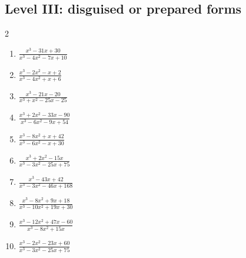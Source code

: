\documentclass[11pt,oneside]{book}
\begin{document}
\subsection*{Level III: disguised or prepared forms}
\begin{multicols}{2}
\begin{enumerate}[leftmargin=*,label=\textbf{\arabic*.},itemsep=0.65\baselineskip]
\item $\displaystyle \frac{x^{3} - 31 x + 30}{x^{3} - 4 x^{2} - 7 x + 10}$
\item $\displaystyle \frac{x^{3} - 2 x^{2} - x + 2}{x^{3} - 4 x^{2} + x + 6}$
\item $\displaystyle \frac{x^{3} - 21 x - 20}{x^{3} + x^{2} - 25 x - 25}$
\item $\displaystyle \frac{x^{3} + 2 x^{2} - 33 x - 90}{x^{3} - 6 x^{2} - 9 x + 54}$
\item $\displaystyle \frac{x^{3} - 8 x^{2} + x + 42}{x^{3} - 6 x^{2} - x + 30}$
\item $\displaystyle \frac{x^{3} + 2 x^{2} - 15 x}{x^{3} - 3 x^{2} - 25 x + 75}$
\item $\displaystyle \frac{x^{3} - 43 x + 42}{x^{3} - 3 x^{2} - 46 x + 168}$
\item $\displaystyle \frac{x^{3} - 8 x^{2} + 9 x + 18}{x^{3} - 10 x^{2} + 19 x + 30}$
\item $\displaystyle \frac{x^{3} - 12 x^{2} + 47 x - 60}{x^{3} - 8 x^{2} + 15 x}$
\item $\displaystyle \frac{x^{3} - 2 x^{2} - 23 x + 60}{x^{3} - 3 x^{2} - 25 x + 75}$
\end{enumerate}
\end{multicols}
\end{document}
